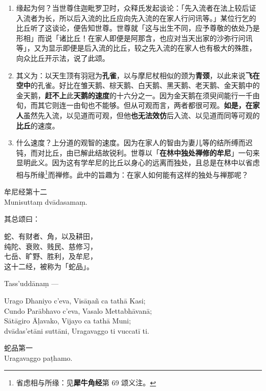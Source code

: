 \begin{enumerate}\item 缘起为何？当世尊住迦毗罗卫时，众释氏发起谈论：「先入流者在法上较后证入流者为长，所以后入流的比丘应向先入流的在家人行问讯等。」某位行乞的比丘听了这谈论，便告知世尊。世尊就「这与出生不同，应予尊敬的依处乃是形相」而说「诸比丘！在家人即便是阿那含，也应对当天出家的沙弥行问讯等」，又为显示即便是后入流的比丘，较之先入流的在家人也有极大的殊胜，向众比丘开示法，说了此颂。
\item 其义为：以天生顶有羽冠为\textbf{孔雀}，以与摩尼杖相似的颈为\textbf{青颈}，以此来说\textbf{飞在空中}的孔雀。好比在雏天鹅、棕天鹅、白天鹅、黑天鹅、老天鹅、金天鹅中的金天鹅，\textbf{赶不上}此\textbf{天鹅的速度}的十六分之一。因为金天鹅在须臾间能行一千由旬，而其它则连一由旬也不能够。但从可观而言，两者都很可观。\textbf{如是，在家人}虽然先入流，以见道而可观，但他\textbf{也无法效仿}后入流、以见道而同等可观的\textbf{比丘}的速度。
\item 什么速度？上分道的观智的速度。因为在家人的智由为妻儿等的结所缚而迟钝，而对比丘，由已解此结故锐利。世尊以「\textbf{在林中独处禅修的牟尼}」一句来显明此义。因为这有学牟尼的比丘以身心的远离而独处，且总是在林中以省虑相与所缘\footnote{省虑相与所缘：见\textbf{犀牛角经}第 69 颂义注。}而禅修。此中的旨趣为：在家人如何能有这样的独处与禅那呢？\end{enumerate}

\begin{center}\vspace{1em}牟尼经第十二\\Munisuttaṃ dvādasamaṃ.\end{center}

其总颂曰：

\begin{quoting}蛇、有财者、角，以及耕田，\\纯陀、衰败、贱民、慈修习，\\七岳、旷野、胜利，及牟尼，\\这十二经，被称为「蛇品」。\end{quoting}

Tass’uddānaṃ —

\begin{quoting}Urago Dhaniyo c’eva, Visāṇañ ca tathā Kasi;\\Cundo Parābhavo c’eva, Vasalo Mettabhāvanā;\\Sātāgiro Āḷavako, Vijayo ca tathā Muni;\\dvādas’etāni suttāni, Uragavaggo ti vuccatī ti.\end{quoting}

\begin{center}\vspace{1em}蛇品第一\\Uragavaggo paṭhamo.\end{center}

